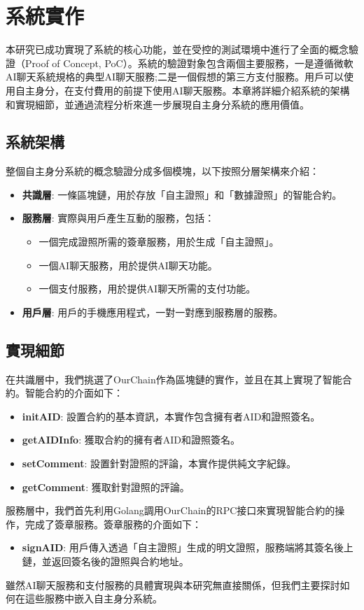 
\chapter{系統實作}
本研究已成功實現了系統的核心功能，並在受控的測試環境中進行了全面的概念驗證（Proof of Concept, PoC）。系統的驗證對象包含兩個主要服務，一是遵循微軟AI聊天系統規格\cite{microsoft_ai_chat_protocol}的典型AI聊天服務;二是一個假想的第三方支付服務。用戶可以使用自主身分，在支付費用的前提下使用AI聊天服務。本章將詳細介紹系統的架構和實現細節，並通過流程分析來進一步展現自主身分系統的應用價值。
\section{系統架構}
整個自主身分系統的概念驗證分成多個模塊，以下按照分層架構來介紹：
\begin{itemize}
  \item \textbf{共識層}: 一條區塊鏈，用於存放「自主證照」和「數據證照」的智能合約。
  \item \textbf{服務層}: 實際與用戶產生互動的服務，包括：
        \begin{itemize}
          \item 一個完成證照所需的簽章服務，用於生成「自主證照」。
          \item 一個AI聊天服務，用於提供AI聊天功能。
          \item 一個支付服務，用於提供AI聊天所需的支付功能。
        \end{itemize}
  \item \textbf{用戶層}: 用戶的手機應用程式，一對一對應到服務層的服務。
\end{itemize}
\section{實現細節}
在共識層中，我們挑選了OurChain\cite{ourlab408_ourchain}作為區塊鏈的實作，並且在其上實現了智能合約。智能合約的介面如下：
\begin{itemize}
  \item \textbf{initAID}: 設置合約的基本資訊，本實作包含擁有者AID和證照簽名。
  \item \textbf{getAIDInfo}: 獲取合約的擁有者AID和證照簽名。
  \item \textbf{setComment}: 設置針對證照的評論，本實作提供純文字紀錄。
  \item \textbf{getComment}: 獲取針對證照的評論。
\end{itemize}
服務層中，我們首先利用Golang調用OurChain的RPC接口來實現智能合約的操作，完成了簽章服務。簽章服務的介面如下：
\begin{itemize}
  \item \textbf{signAID}: 用戶傳入透過「自主證照」生成的明文證照，服務端將其簽名後上鏈，並返回簽名後的證照與合約地址。
\end{itemize}
雖然AI聊天服務和支付服務的具體實現與本研究無直接關係，但我們主要探討如何在這些服務中嵌入自主身分系統。

